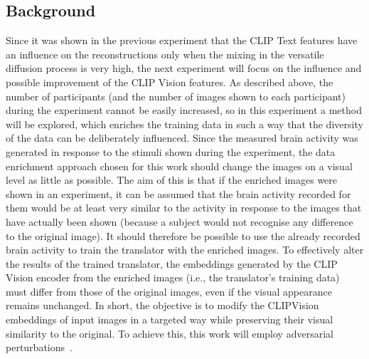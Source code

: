 \subsection{Background}
Since it was shown in the previous experiment that the CLIP Text features have an influence on the reconstructions only when the mixing in the versatile diffusion process is very high, the next experiment will focus on the influence and possible improvement of the CLIP Vision features. As described above, the number of participants (and the number of images shown to each participant) during the experiment cannot be easily increased, so in this experiment a method will be explored, which enriches the training data in such a way that the diversity of the data can be deliberately influenced. Since the measured brain activity was generated in response to the stimuli shown during the experiment, the data enrichment approach chosen for this work should change the images on a visual level as little as possible. The aim of this is that if the enriched images were shown in an experiment, it can be assumed that the brain activity recorded for them would be at least very similar to the activity in response to the images that have actually been shown (because a subject would not recognise any difference to the original image). It should therefore be possible to use the already recorded brain activity to train the translator with the enriched images. To effectively alter the results of the trained translator, the embeddings generated by the CLIP Vision encoder from the enriched images (i.e., the translator's training data) must differ from those of the original images, even if the visual appearance remains unchanged. In short, the objective is to modify the CLIPVision embeddings of input images in a targeted way while preserving their visual similarity to the original. To achieve this, this work will employ adversarial perturbations~\cite{goodfellowExplainingHarnessingAdversarial2014, papernotPracticalBlackBoxAttacks2017, naseerIntriguingPropertiesVision2021}.

